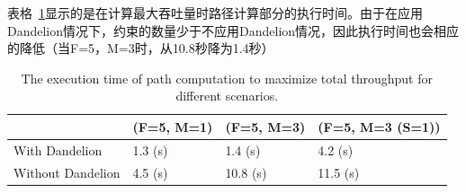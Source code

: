 




表格~\ref{table:eval1}显示的是在计算最大吞吐量时路径计算部分的执行时间。由于在应用Dandelion情况下，约束的数量少于不应用Dandelion情况，因此执行时间也会相应的降低（当F=5，M=3时，从10.8秒降为1.4秒）



\begin{table}[]
\footnotesize
\begin{tabular}{|l|l|l|l|}
\hline
             & \footnotesize(F=5, M=1) & \footnotesize (F=5, M=3) & \footnotesize (F=5, M=3 (S=1)) \\ \hline
With Dandelion    & 1.3 (s)    & 1.4 (s)    & 4.2 (s)          \\ \hline
Without Dandelion & 4.5 (s)    & 10.8 (s)   & 11.5 (s)         \\ \hline
\end{tabular}
\caption{\small The execution time of path computation to maximize total throughput for different scenarios.}
\label{table:eval1}
\end{table}

